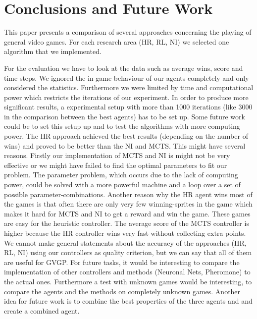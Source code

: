 \section{Conclusions and Future Work} 
\label{sec:conc}

This paper presents a comparison of several approaches concerning the playing of general video games. For each research area (\ac{HR}, \ac{RL}, \ac{NI})
we selected one algorithm that we implemented.


For the evaluation we have to look at the data such as average wins, score and time steps.
We ignored the in-game behaviour of our agents completely and only considered the statistics. 
Furthermore we were limited by time and computational power which restricts the iterations of our experiment. 
In order to produce more significant results, a experimental setup with more than 1000 iterations (like 3000 in the comparison between the best agents) has to be set up.
Some future work could be to set this setup up and to test the algorithms with more computing power.  
The \ac{HR} approach achieved the best results (depending on the number of wins) and proved to be better than the \ac{NI} and \ac{MCTS}. This might have several reasons. Firstly our implementation of \ac{MCTS} and \ac{NI} is might not be very effective or we might have failed to find the optimal parameters to fit our problem. The parameter problem, which occurs due to the lack of computing power, could be solved with a more powerful machine and a loop over a set of possible parameter-combinations.
Another reason why the \ac{HR} agent wins most of the games is that often there are only very few winning-sprites in the game which makes it hard for \ac{MCTS} and \ac{NI} to get a reward and win the game. These games are easy for the heuristic controller. The average score of the \ac{MCTS} controller is higher because the \ac{HR} controller wins very fast without collecting extra points. 
We cannot make general statements about the accuracy of the approaches (\acs{HR}, \acs{RL}, \acs{NI}) using our controllers as quality criterion, but we can say that all of them are useful for \ac{GVGP}.
For future tasks, it would be interesting to compare the implementation of other controllers and methods (Neuronal Nets, Pheromone) to the actual ones. Furthermore a test with unknown games would be interesting, to compare the agents and the methods on completely unknown games.
Another idea for future work is to combine the best properties of the three agents and and create a combined agent.
